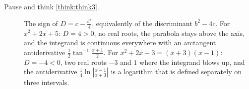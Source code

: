 \documentclass[11pt]{article}
\begin{document}
\begin{description}
  \item[Pause and think \ref{think:think3}.] The sign of $D=c-\frac{b^2}4$, equivalently of the discriminant $b^2-4c$. For $x^2+2x+5$: $D=4>0$, no real roots, the parabola stays above the axis, and the integrand is continuous everywhere with an arctangent antiderivative $\frac12\tan^{-1}\frac{x+1}2$. For $x^2+2x-3=(x+3)(x-1)$: $D=-4<0$, two real roots $-3$ and $1$ where the integrand blows up, and the antiderivative $\frac14\ln\left\lvert\frac{x-1}{x+3}\right\rvert$ is a logarithm that is defined separately on three intervals.
\end{description}
\end{document}
